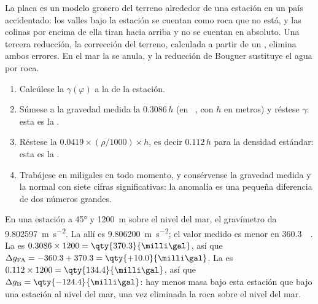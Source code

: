La placa es un modelo grosero del terreno alrededor de una estación en un país accidentado: los valles bajo la estación se cuentan
como roca que no está, y las colinas por encima de ella tiran hacia arriba y no se cuentan en absoluto. Una tercera reducción, la
corrección del terreno, calculada a partir de un , elimina ambos errores. En el mar la  se anula, y la reducción de Bouguer sustituye el agua por roca.

\begin{method}\label{met:b1:isostasy-gravity:reduction}
\begin{enumerate}
  \item Calcúlese la  $\gamma(\varphi)$ a la  de la estación.
  \item Súmese a la gravedad medida la  $0.3086\,h$ (en \unit{\milli\gal}, con $h$
        en metros) y réstese $\gamma$: esta es la .
  \item Réstese la  $0.0419\times(\rho/1000)\times h$, es decir
        $0.112\,h$ para la densidad estándar: esta es la .
  \item Trabájese en miligales en todo momento, y consérvense la gravedad medida y la normal con siete cifras significativas: la
        anomalía es una pequeña diferencia de dos números grandes.
\end{enumerate}
\end{method}

\begin{example}\label{ex:b1:isostasy-gravity:reduction}
En una estación a  \ang{45} y \qty{1200}{m} sobre el nivel del mar, el gravímetro da \qty{9.802597}{m.s^{-2}}. La  allí es \qty{9.806200}{m.s^{-2}}; el valor medido es menor en \qty{360.3}{\milli\gal}.
La  es $0.3086\times1200 = \qty{370.3}{\milli\gal}$, así que
$\Delta g_{\mathrm{FA}} = -360.3 + 370.3 = \qty{+10.0}{\milli\gal}$. La 
es $0.112\times1200 = \qty{134.4}{\milli\gal}$, así que $\Delta g_{\mathrm B}
= \qty{-124.4}{\milli\gal}$: hay menos masa bajo esta estación que bajo una estación al nivel del mar, una vez eliminada la roca
sobre el nivel del mar.
\end{example}

